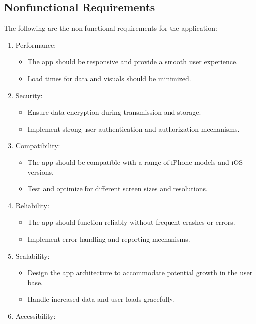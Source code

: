 \subsection{Nonfunctional Requirements}
The following are the non-functional requirements for the application:
    \begin{enumerate}
        \item Performance:
        \begin{itemize}
            \item The app should be responsive and provide a smooth user experience.
            \item Load times for data and visuals should be minimized.
        \end{itemize}
        \item Security:
        \begin{itemize}
            \item Ensure data encryption during transmission and storage.
            \item Implement strong user authentication and authorization mechanisms.
        \end{itemize}
        \item Compatibility:
        \begin{itemize}
            \item The app should be compatible with a range of iPhone models and iOS versions.
            \item Test and optimize for different screen sizes and resolutions.
        \end{itemize}
        \item Reliability:
        \begin{itemize}
            \item The app should function reliably without frequent crashes or errors.
            \item Implement error handling and reporting mechanisms.
        \end{itemize}
        \item Scalability:
        \begin{itemize}
            \item Design the app architecture to accommodate potential growth in the user base.
            \item Handle increased data and user loads gracefully.
        \end{itemize}
        \item Accessibility:
        \begin{itemize}

\end{itemize}
\end{enumerate}
